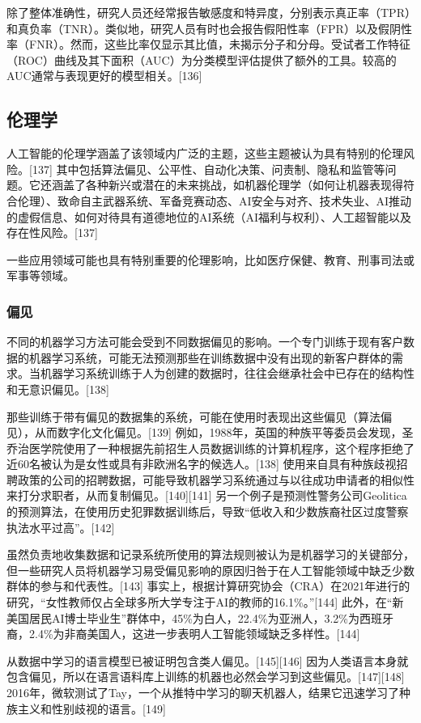 除了整体准确性，研究人员还经常报告敏感度和特异度，分别表示真正率（TPR）和真负率（TNR）。类似地，研究人员有时也会报告假阳性率（FPR）以及假阴性率（FNR）。然而，这些比率仅显示其比值，未揭示分子和分母。受试者工作特征（ROC）曲线及其下面积（AUC）为分类模型评估提供了额外的工具。较高的AUC通常与表现更好的模型相关。[136]
\subsection{伦理学}  
人工智能的伦理学涵盖了该领域内广泛的主题，这些主题被认为具有特别的伦理风险。[137] 其中包括算法偏见、公平性、自动化决策、问责制、隐私和监管等问题。它还涵盖了各种新兴或潜在的未来挑战，如机器伦理学（如何让机器表现得符合伦理）、致命自主武器系统、军备竞赛动态、AI安全与对齐、技术失业、AI推动的虚假信息、如何对待具有道德地位的AI系统（AI福利与权利）、人工超智能以及存在性风险。[137]

一些应用领域可能也具有特别重要的伦理影响，比如医疗保健、教育、刑事司法或军事等领域。
\subsubsection{偏见} 
不同的机器学习方法可能会受到不同数据偏见的影响。一个专门训练于现有客户数据的机器学习系统，可能无法预测那些在训练数据中没有出现的新客户群体的需求。当机器学习系统训练于人为创建的数据时，往往会继承社会中已存在的结构性和无意识偏见。[138]  

那些训练于带有偏见的数据集的系统，可能在使用时表现出这些偏见（算法偏见），从而数字化文化偏见。[139] 例如，1988年，英国的种族平等委员会发现，圣乔治医学院使用了一种根据先前招生人员数据训练的计算机程序，这个程序拒绝了近60名被认为是女性或具有非欧洲名字的候选人。[138] 使用来自具有种族歧视招聘政策的公司的招聘数据，可能导致机器学习系统通过与以往成功申请者的相似性来打分求职者，从而复制偏见。[140][141] 另一个例子是预测性警务公司Geolitica的预测算法，在使用历史犯罪数据训练后，导致“低收入和少数族裔社区过度警察执法水平过高”。[142]  

虽然负责地收集数据和记录系统所使用的算法规则被认为是机器学习的关键部分，但一些研究人员将机器学习易受偏见影响的原因归咎于在人工智能领域中缺乏少数群体的参与和代表性。[143] 事实上，根据计算研究协会（CRA）在2021年进行的研究，“女性教师仅占全球多所大学专注于AI的教师的16.1\%。”[144] 此外，在“新美国居民AI博士毕业生”群体中，45\%为白人，22.4\%为亚洲人，3.2\%为西班牙裔，2.4\%为非裔美国人，这进一步表明人工智能领域缺乏多样性。[144]  

从数据中学习的语言模型已被证明包含类人偏见。[145][146] 因为人类语言本身就包含偏见，所以在语言语料库上训练的机器也必然会学习到这些偏见。[147][148] 2016年，微软测试了Tay，一个从推特中学习的聊天机器人，结果它迅速学习了种族主义和性别歧视的语言。[149]  

